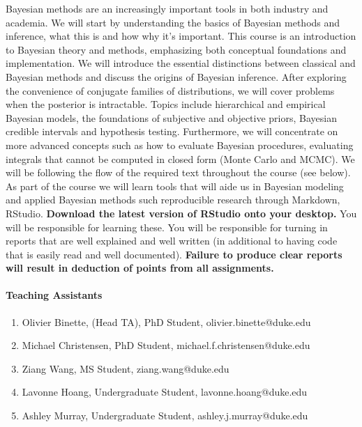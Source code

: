 \documentclass[11pt]{article}
\begin{document}
Bayesian methods are an increasingly important tools
in both industry and academia. We will start by understanding the basics of Bayesian methods and inference, what this is and how why it's important. This course is an introduction to Bayesian theory and methods, emphasizing both conceptual foundations and implementation. We will introduce the essential distinctions between classical and Bayesian methods and discuss the origins of Bayesian inference. After exploring the convenience of conjugate families of distributions, we will cover problems when the posterior is intractable. Topics include hierarchical and empirical Bayesian models, the foundations of subjective and objective priors, Bayesian credible intervals and hypothesis testing. Furthermore, we 
will  concentrate on more advanced concepts such as how to evaluate Bayesian procedures, evaluating integrals that cannot be computed in closed form (Monte Carlo and MCMC). We will be following the flow of the required text throughout the course (see below). \\

As part of the course we will learn tools that will aide us in Bayesian modeling and applied Bayesian methods such reproducible research through Markdown, RStudio. \textbf{Download the latest version of RStudio onto your desktop.} You will be responsible for learning these. You will be responsible for turning in reports that are well explained and well written (in additional to having code that is easily read and well documented). \textbf{Failure to produce clear reports will result in deduction of points from all assignments.} 
\\


\paragraph{Teaching Assistants}

\begin{enumerate}
\item Olivier Binette, (Head TA), PhD Student, olivier.binette@duke.edu
\item Michael Christensen, PhD Student, michael.f.christensen@duke.edu
\item Ziang Wang, MS Student, ziang.wang@duke.edu
\item Lavonne Hoang, Undergraduate Student, lavonne.hoang@duke.edu
\item Ashley Murray, Undergraduate Student, ashley.j.murray@duke.edu
\end{enumerate}
\end{document}
